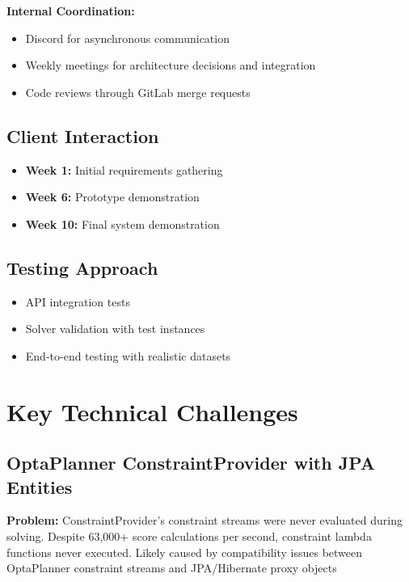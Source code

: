 \documentclass[12pt,a4paper]{report}
\begin{document}
\textbf{Internal Coordination:}
\begin{itemize}
    \item Discord for asynchronous communication
    \item Weekly meetings for architecture decisions and integration
    \item Code reviews through GitLab merge requests
\end{itemize}

\subsection{Client Interaction}

\begin{itemize}
    \item \textbf{Week 1:} Initial requirements gathering
    \item \textbf{Week 6:} Prototype demonstration
    \item \textbf{Week 10:} Final system demonstration
\end{itemize}

\subsection{Testing Approach}

\begin{itemize}
    \item API integration tests
    \item Solver validation with test instances
    \item End-to-end testing with realistic datasets
\end{itemize}

\section{Key Technical Challenges}

\subsection{OptaPlanner ConstraintProvider with JPA Entities}

\textbf{Problem:} ConstraintProvider's constraint streams were never evaluated during solving. Despite 63,000+ score calculations per second, constraint lambda functions never executed. Likely caused by compatibility issues between OptaPlanner constraint streams and JPA/Hibernate proxy objects
\end{document}
